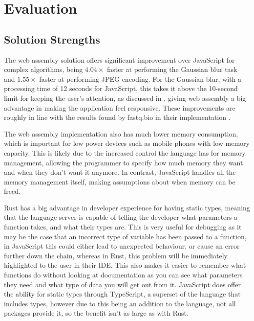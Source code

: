 \documentclass[12pt,a4paper]{article}
\begin{document}
\newpage
\section{Evaluation}

\subsection{Solution Strengths}

The web assembly solution offers significant improvement over JavaScript for complex algorithms, being $4.04 \times$ faster at performing the Gaussian blur task and $1.55 \times$ faster at performing JPEG encoding. For the Gaussian blur, with a processing time of 12 seconds for JavaScript, this takes it above the 10-second limit for keeping the user's attention, as discussed in \cite{nielsen1994usability}, giving web assembly a big advantage in making the application feel responsive. These improvements are roughly in line with the results found by fastq.bio in their implementation \cite{fastq}.

The web assembly implementation also has much lower memory consumption, which is important for low power devices such as mobile phones with low memory capacity. This is likely due to the increased control the language has for memory management, allowing the programmer to specify how much memory they want and when they don't want it anymore. In contrast, JavaScript handles all the memory management itself, making assumptions about when memory can be freed.

Rust has a big advantage in developer experience for having static types, meaning that the language server is capable of telling the developer what parameters a function takes, and what their types are. This is very useful for debugging as it may be the case that an incorrect type of variable has been passed to a function, in JavaScript this could either lead to unexpected behaviour, or cause an error further down the chain, whereas in Rust, this problem will be immediately highlighted to the user in their IDE. This also makes it easier to remember what functions do without looking at documentation as you can see what parameters they need and what type of data you will get out from it. JavaScript does offer the ability for static types through TypeScript, a superset of the language that includes types, however due to this being an addition to the language, not all packages provide it, so the benefit isn't as large as with Rust.
\end{document}
